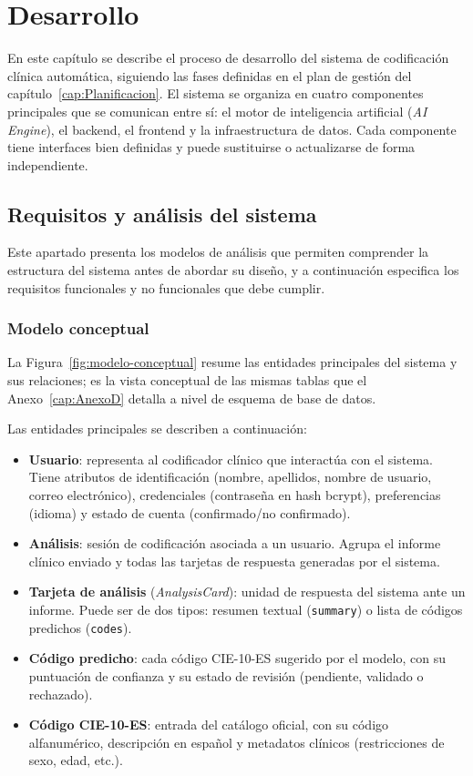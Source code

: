\chapter{Desarrollo}
\label{cap:Desarrollo}

En este capítulo se describe el proceso de desarrollo del sistema de codificación clínica automática, siguiendo las fases definidas en el plan de gestión del capítulo~\ref{cap:Planificacion}. El sistema se organiza en cuatro componentes principales que se comunican entre sí: el motor de inteligencia artificial (\emph{AI Engine}), el backend, el frontend y la infraestructura de datos. Cada componente tiene interfaces bien definidas y puede sustituirse o actualizarse de forma independiente.

\section{Requisitos y análisis del sistema}

Este apartado presenta los modelos de análisis que permiten comprender la estructura del sistema antes de abordar su diseño, y a continuación especifica los requisitos funcionales y no funcionales que debe cumplir.

\subsection{Modelo conceptual}

La Figura~\ref{fig:modelo-conceptual} resume las entidades principales del sistema y sus relaciones; es la vista conceptual de las mismas tablas que el Anexo~\ref{cap:AnexoD} detalla a nivel de esquema de base de datos.

Las entidades principales se describen a continuación:

\begin{itemize}
 \item \textbf{Usuario}: representa al codificador clínico que interactúa con el sistema. Tiene atributos de identificación (nombre, apellidos, nombre de usuario, correo electrónico), credenciales (contraseña en hash bcrypt), preferencias (idioma) y estado de cuenta (confirmado/no confirmado).
 \item \textbf{Análisis}: sesión de codificación asociada a un usuario. Agrupa el informe clínico enviado y todas las tarjetas de respuesta generadas por el sistema.
 \item \textbf{Tarjeta de análisis} (\emph{AnalysisCard}): unidad de respuesta del sistema ante un informe. Puede ser de dos tipos: resumen textual (\texttt{summary}) o lista de códigos predichos (\texttt{codes}).
 \item \textbf{Código predicho}: cada código CIE-10-ES sugerido por el modelo, con su puntuación de confianza y su estado de revisión (pendiente, validado o rechazado).
 \item \textbf{Código CIE-10-ES}: entrada del catálogo oficial, con su código alfanumérico, descripción en español y metadatos clínicos (restricciones de sexo, edad, etc.).
\end{itemize}

